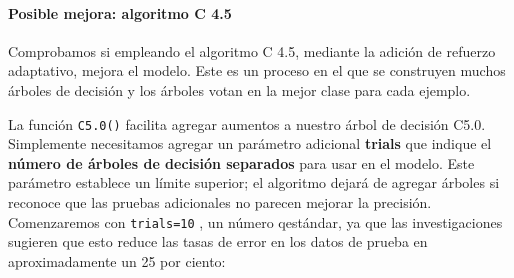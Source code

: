 \documentclass[
]{article}
\newenvironment{Shaded}{\begin{snugshade}}{\end{snugshade}}
\newcommand{\CommentTok}[1]{\textcolor[rgb]{0.56,0.35,0.01}{\textit{#1}}}
\newcommand{\DataTypeTok}[1]{\textcolor[rgb]{0.13,0.29,0.53}{#1}}
\newcommand{\DecValTok}[1]{\textcolor[rgb]{0.00,0.00,0.81}{#1}}
\newcommand{\KeywordTok}[1]{\textcolor[rgb]{0.13,0.29,0.53}{\textbf{#1}}}
\newcommand{\NormalTok}[1]{#1}
\newcommand{\OperatorTok}[1]{\textcolor[rgb]{0.81,0.36,0.00}{\textbf{#1}}}
\newcommand{\StringTok}[1]{\textcolor[rgb]{0.31,0.60,0.02}{#1}}
\let\oldparagraph\paragraph
\renewcommand{\paragraph}[1]{\oldparagraph{#1}\mbox{}}
\begin{document}
\hypertarget{posible-mejora-algoritmo-c-4.5}{%
\paragraph{Posible mejora: algoritmo C
4.5}\label{posible-mejora-algoritmo-c-4.5}}

Comprobamos si empleando el algoritmo C 4.5, mediante la adición de
refuerzo adaptativo, mejora el modelo. Este es un proceso en el que se
construyen muchos árboles de decisión y los árboles votan en la mejor
clase para cada ejemplo.

La función \texttt{C5.0()} facilita agregar aumentos a nuestro árbol de
decisión C5.0. Simplemente necesitamos agregar un parámetro adicional
\textbf{trials} que indique el \textbf{número de árboles de decisión
separados} para usar en el modelo. Este parámetro establece un límite
superior; el algoritmo dejará de agregar árboles si reconoce que las
pruebas adicionales no parecen mejorar la precisión. Comenzaremos con
\texttt{trials=10} , un número qestándar, ya que las investigaciones
sugieren que esto reduce las tasas de error en los datos de prueba en
aproximadamente un 25 por ciento:

\begin{Shaded}
\end{Shaded}
\end{document}
